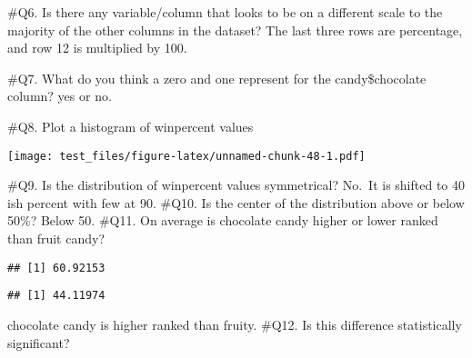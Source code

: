 \documentclass[
]{article}
\newenvironment{Shaded}{\begin{snugshade}}{\end{snugshade}}
\newcommand{\FunctionTok}[1]{\textcolor[rgb]{0.00,0.00,0.00}{#1}}
\newcommand{\NormalTok}[1]{#1}
\newcommand{\OtherTok}[1]{\textcolor[rgb]{0.56,0.35,0.01}{#1}}
\newcommand{\SpecialCharTok}[1]{\textcolor[rgb]{0.00,0.00,0.00}{#1}}
\begin{document}
\#Q6. Is there any variable/column that looks to be on a different scale
to the majority of the other columns in the dataset? The last three rows
are percentage, and row 12 is multiplied by 100.

\#Q7. What do you think a zero and one represent for the
candy\$chocolate column? yes or no.

\#Q8. Plot a histogram of winpercent values

\begin{Shaded}
\end{Shaded}

\texttt{[image: test\_files/figure-latex/unnamed-chunk-48-1.pdf]}

\#Q9. Is the distribution of winpercent values symmetrical? No.~It is
shifted to 40 ish percent with few at 90. \#Q10. Is the center of the
distribution above or below 50\%? Below 50. \#Q11. On average is
chocolate candy higher or lower ranked than fruit candy?

\begin{Shaded}
\end{Shaded}

\begin{verbatim}
## [1] 60.92153
\end{verbatim}

\begin{Shaded}
\end{Shaded}

\begin{verbatim}
## [1] 44.11974
\end{verbatim}

chocolate candy is higher ranked than fruity. \#Q12. Is this difference
statistically significant?
\end{document}
